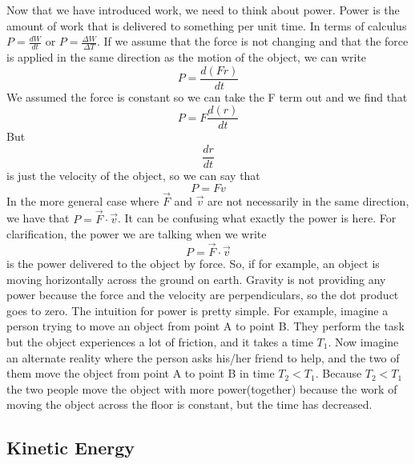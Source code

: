 \documentclass{article}[gray]
\numberwithin{equation}{subsection}
\begin{document}
Now that we have introduced work, we need to think about power. Power is the amount of work that is delivered to something per unit time. In terms of calculus $P=\frac{dW}{dt}$ or $P = \frac{\Delta W}{\Delta T}$. If we assume that the force is not changing and that the force is applied in the same direction as the motion of the object, we can write $$P=\frac{d\left(Fr\right)}{dt}$$ We assumed the force is constant so we can take the F term out and we find that $$P=F\frac{d\left(r\right)}{dt}$$ But $$\frac{dr}{dt}$$ is just the velocity of the object, so we can say that $$P=Fv$$ In the more general case where $\vec{F}$ and $\vec{v}$ are not necessarily in the same direction, we have that $P=\vec{F}\cdot \vec{v}$. It can be confusing what exactly the power is here. For clarification, the power we are talking when we write \begin{equation}P=\vec{F} \cdot \vec{v}\end{equation} is the power delivered to the object by force. So, if for example, an object is moving horizontally across the ground on earth. Gravity is not providing any power because the force and the velocity are perpendiculars, so the dot product goes to zero. The intuition for power is pretty simple. For example, imagine a person trying to move an object from point A to point B. They perform the task but the object experiences a lot of friction, and it takes a time $T_1$. Now imagine an alternate reality where the person asks his/her friend to help, and the two of them move the object from point A to point B in time $T_2<T_1$. Because $T_2<T_1$ the two people move the object with more power(together) because the work of moving the object across the floor is constant, but the time has decreased. 

\subsection{Kinetic Energy}
\end{document}
